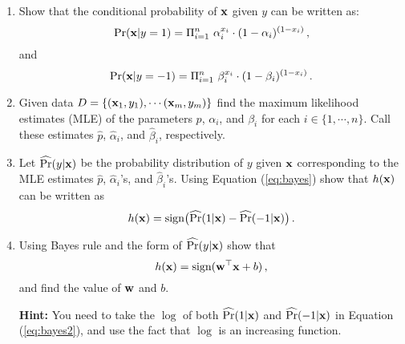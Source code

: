\begin{enumerate}


\item Show that the conditional probability of $\mathbf{x}$ given $y$ can be written as:
\[
\Pr(\mathbf{x} | y = 1) = \Pi_{i=1}^n ~  \alpha_i^{x_i} \cdot (1-\alpha_i)^{(1-x_i)}
	\,,
\] 
and 
\[
\Pr(\mathbf{x} | y = -1) = \Pi_{i=1}^n ~ \beta_i^{x_i} \cdot (1-\beta_i)^{(1-x_i)}
	\,.
\] 



\item Given data $D = \{(\mathbf{x}_1, y_1), \cdots (\mathbf{x}_m, y_m)\}$ find the maximum likelihood estimates (MLE) of the parameters $p$, $\alpha_i$, and $\beta_i$ for each $ i \in \{1, \cdots, n\}$. Call these estimates $\hat{p}$, $\hat{\alpha}_i$, and $\hat{\beta}_i$, respectively.




\item Let $\widehat{\Pr}(y | \mathbf{x})$ be the probability distribution of $y$ given $\mathbf{x}$ corresponding to the MLE estimates $\hat{p}$, $\hat{\alpha}_i$'s, and $\hat{\beta}_i$'s. Using Equation (\ref{eq:bayes}) show that $h(\mathbf{x})$ can be written as
\begin{equation}
h(\mathbf{x}) = \text{sign} \big( \widehat{\Pr}( 1 | \mathbf{x} ) - \widehat{\Pr}( -1 | \mathbf{x}) \big)  \label{eq:bayes2}
	\,.
\end{equation}


\item Using Bayes rule and the form of $\widehat{\Pr}(y | \mathbf{x})$ show that
\[
	h(\mathbf{x}) = \text{sign} (\mathbf{w}^\top \mathbf{x} + b)
	\,,
\]
and find the value of $\mathbf{w}$ and $b$.


\textbf{Hint:} You need to take the $\log$ of both $\widehat{\Pr}(1 | \mathbf{x})$ and $\widehat{\Pr}(-1 | \mathbf{x})$ in Equation (\ref{eq:bayes2}), and use the fact that $\log$ is an increasing function.


\end{enumerate}











